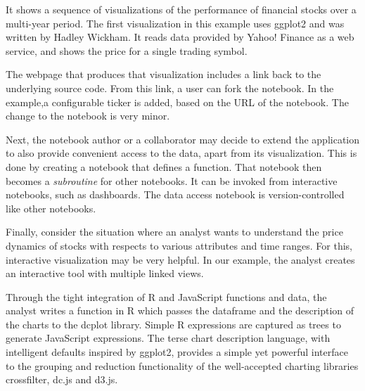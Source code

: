 It shows a sequence of visualizations of the performance
of financial stocks over a multi-year period. The first visualization
in this example uses ggplot2 and was written by Hadley Wickham.
It reads data provided by Yahoo! Finance as a web service, and shows
the price for a single trading symbol.

The webpage that produces that visualization includes a link back to
the underlying source code. From this link, a user can fork the notebook.
In the example,a configurable ticker is added, based on the URL of
the notebook. The change to the notebook is very minor.

Next, the notebook author or a collaborator may decide to extend
the application to also provide convenient access to the data,
apart from its visualization.
This is done by creating a notebook that defines a function.
That notebook then becomes a \emph{subroutine} for other notebooks.
It can be invoked from interactive notebooks, such as dashboards.
The data access notebook is version-controlled like other notebooks.

Finally, consider the situation where an analyst wants to understand
the price dynamics of stocks with respects to various attributes and
time ranges. For this, interactive visualization may be very helpful.
In our example, the analyst creates an interactive tool with multiple
linked views.

Through the tight integration of R and JavaScript functions and data,
the analyst writes a function in R which passes the dataframe and the
description of the charts to the dcplot library.  Simple R expressions
are captured as trees to generate JavaScript expressions.  The terse
chart description language, with intelligent defaults inspired by
ggplot2, provides a simple yet powerful interface to the grouping
and reduction functionality of the well-accepted charting libraries
crossfilter, dc.js and d3.js.


%
